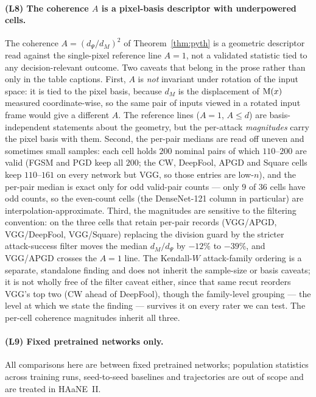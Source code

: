 \paragraph{(L8) The coherence $A$ is a pixel-basis descriptor with underpowered cells.}
The coherence $A = (d_\Psi/d_M)^2$ of Theorem~\ref{thm:pyth} is a geometric
descriptor read against the single-pixel reference line $A=1$, not a
validated statistic tied to any decision-relevant outcome. Two caveats
that belong in the prose rather than only in the table captions. First,
$A$ is \emph{not} invariant under rotation of the input space: it is
tied to the pixel basis, because $d_M$ is the displacement of $\mathrm{M}(x)$
measured coordinate-wise, so the same pair of inputs viewed in a rotated
input frame would give a different $A$. The reference lines ($A=1$,
$A\le d$) are basis-independent statements about the geometry, but the
per-attack \emph{magnitudes} carry the pixel basis with them. Second,
the per-pair medians are read off uneven and sometimes small samples:
each cell holds $200$ nominal pairs of which $110$--$200$ are valid (FGSM and
PGD keep all $200$; the CW, DeepFool, APGD and Square cells keep $110$--$161$
on every network but VGG, so those entries are low-$n$), and the per-pair median is
exact only for odd valid-pair counts --- only $9$ of $36$ cells have odd
counts, so the even-count cells (the DenseNet-121 column in particular)
are interpolation-approximate. Third, the magnitudes are sensitive to the
filtering convention: on the three cells that retain per-pair records
(VGG/APGD, VGG/DeepFool, VGG/Square) replacing the division guard by the
stricter attack-success filter moves the median $d_M/d_\Psi$ by $-12\%$ to
$-39\%$, and VGG/APGD crosses the $A=1$ line. The Kendall-$W$ attack-family
ordering is a separate, standalone finding and does not inherit the
sample-size or basis caveats; it is not wholly free of the filter caveat
either, since that same recut reorders VGG's top two (CW ahead of
DeepFool), though the family-level grouping --- the level at which we state
the finding --- survives it on every rater we can test. The per-cell
coherence magnitudes inherit all three.

\paragraph{(L9) Fixed pretrained networks only.}
All comparisons here are between fixed pretrained networks; population
statistics across training runs, seed-to-seed baselines and trajectories
are out of scope and are treated in HAaNE~II.

